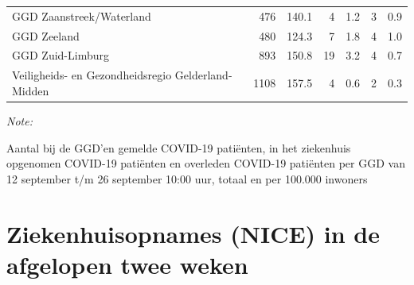 \documentclass[
  english,
  man,floatsintext]{apa6}
\begin{document}
\begin{table}
\begin{threeparttable}
\begin{tabular}{lrrrrrr}
GGD Zaanstreek/Waterland & 476 & 140.1 & 4 & 1.2 & 3 & 0.9\\
GGD Zeeland & 480 & 124.3 & 7 & 1.8 & 4 & 1.0\\
GGD Zuid-Limburg & 893 & 150.8 & 19 & 3.2 & 4 & 0.7\\
Veiligheids- en Gezondheidsregio Gelderland-Midden & 1108 & 157.5 & 4 & 0.6 & 2 & 0.3\\
\bottomrule
\end{tabular}
\begin{tablenotes}
\item \textit{Note: } 
\item Aantal bij de GGD’en gemelde COVID-19 patiënten, in het ziekenhuis opgenomen COVID-19 patiënten en overleden COVID-19 patiënten per GGD van 12 september t/m 26 september 10:00 uur, totaal en per 100.000 inwoners
\end{tablenotes}
\end{threeparttable}
\endgroup{}
\end{table}

\newpage

\hypertarget{ziekenhuisopnames-nice-in-de-afgelopen-twee-weken}{%
\section{Ziekenhuisopnames (NICE) in de afgelopen twee weken}\label{ziekenhuisopnames-nice-in-de-afgelopen-twee-weken}}
\end{document}

